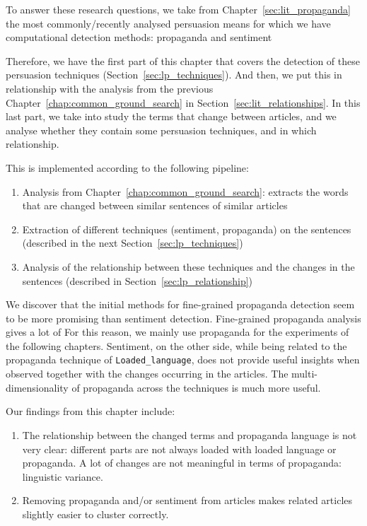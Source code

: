 
To answer these research questions, we take from Chapter~\ref{sec:lit_propaganda} the most commonly/recently analysed \gls{persuasion} means for which we have computational detection methods: \gls{propaganda} and \gls{sentiment} %

Therefore, we have the first part of this chapter that covers the detection of these persuasion techniques (Section~\ref{sec:lp_techniques}).
And then, we put this in relationship with the analysis from the previous Chapter~\ref{chap:common_ground_search} in Section~\ref{sec:lit_relationships}.
In this last part, 
we take into study the terms that change between articles, and we analyse whether they contain some persuasion techniques, and in which relationship. %

This is implemented according to the following pipeline:
\begin{enumerate}
    \item Analysis from Chapter~\ref{chap:common_ground_search}: extracts the words that are changed between similar sentences of similar articles
    \item Extraction of different techniques (sentiment, propaganda) on the sentences (described in the next Section~\ref{sec:lp_techniques})
    \item Analysis of the relationship between these techniques and the changes in the sentences (described in Section~\ref{sec:lp_relationship})
\end{enumerate}


We discover that
the initial methods for fine-grained propaganda detection seem to be more promising than sentiment detection.
Fine-grained propaganda analysis gives a lot of
For this reason, we mainly use propaganda for the experiments of the following chapters. 
Sentiment, on the other side, while being related to the propaganda technique of \texttt{Loaded\_language}, does not provide useful insights when observed together with the changes occurring in the articles. The multi-dimensionality of propaganda across the techniques is much more useful.

Our findings from this chapter include:
\begin{enumerate}
    \item The relationship between the changed terms and propaganda language is not very clear: different parts are not always loaded with loaded language or propaganda. A lot of changes are not meaningful in terms of propaganda: linguistic variance.
    \item Removing propaganda and/or sentiment from articles makes related articles slightly easier to cluster correctly.
\end{enumerate}

